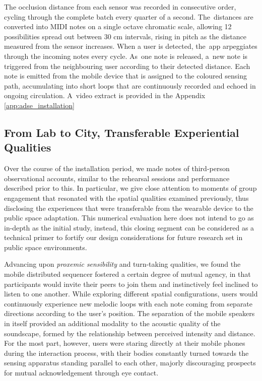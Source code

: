 The occlusion distance from each sensor was recorded in consecutive order, cycling through the complete batch every quarter of a second. The~distances are converted into MIDI notes on a single octave chromatic scale, allowing 12 possibilities spread out between 30 cm intervals, rising in pitch as the distance measured from the sensor increases. When a user is detected, the~app arpeggiates through the incoming notes every cycle. As~one note is released, a~new note is triggered from the neighbouring user according to their detected distance. Each note is emitted from the mobile device that is assigned to the coloured sensing path, accumulating into short loops that are continuously recorded and echoed in ongoing circulation. A~video extract is provided in the Appendix \ref{app:adse_installation}

\subsection*{From Lab to City, Transferable Experiential Qualities}
\label{sec:fromLabToCity}

Over the course of the installation period, we made notes of third-person observational accounts, similar to the rehearsal sessions and performance described prior to this. In particular, we give close attention to moments of group engagement that resonated with the spatial qualities examined previously, thus disclosing the experiences that were transferable from the wearable device to the public space adaptation. This numerical evaluation here does not intend to go as in-depth as the initial study, instead, this closing segment can be considered as a technical primer to fortify our design considerations for future research set in public space environments.

Advancing upon \textit{proxemic sensibility} and turn-taking qualities, we found the mobile distributed sequencer fostered a certain degree of mutual agency, in that participants would invite their peers to join them and instinctively feel inclined to listen to one another. While exploring different spatial configurations, users would continuously experience new melodic loops with each note coming from separate directions according to the user's position. The separation of the mobile speakers in itself provided an additional modality to the acoustic quality of the soundscape, formed by the relationship between perceived intensity and distance. For the most part, however, users were staring directly at their mobile phones during the interaction process, with their bodies constantly turned towards the sensing apparatus standing parallel to each other, majorly discouraging prospects for mutual acknowledgement through eye contact.

